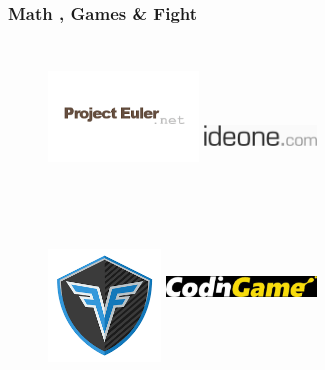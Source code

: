 \documentclass{beamer}
\begin{document}

\begin{frame}
	\frametitle{Math , Games \& Fight}
	
	\begin{figure}
	\center
	\href{https://projecteuler.net/archives} {\includegraphics[width=4cm,height=4cm,keepaspectratio]{images/judges/projecteuler}}
	\href{http://ideone.com/}{\includegraphics[width=3cm,height=3cm,keepaspectratio]{images/tools/ideone}}
	\end{figure}
	\begin{figure}
	\center
	\href{https://codefights.com/}{\includegraphics[width=3cm,height=3cm,keepaspectratio]{images/judges/codefights}}
	\href{https://www.codingame.com/start}{\includegraphics[width=4cm,height=4cm,keepaspectratio]{images/judges/codingame}}
	\end{figure}

\end{frame}


\end{document}
